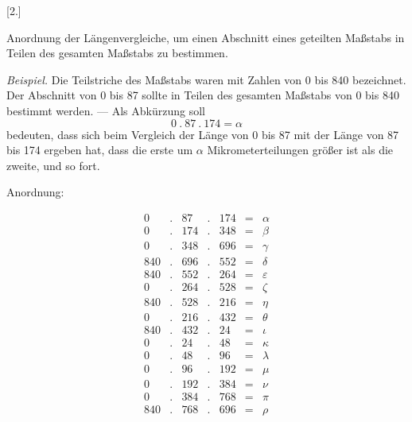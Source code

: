 \par{}
\begin{center}[2.]\end{center}
Anordnung der Längenvergleiche, um einen Abschnitt eines geteilten Maßstabs in Teilen des gesamten Maßstabs zu bestimmen.

\textit{Beispiel.} Die Teilstriche des Maßstabs waren mit Zahlen von 0 bis 840 bezeichnet. Der Abschnitt von 0 bis 87 sollte in Teilen des gesamten Maßstabs von 0 bis 840 bestimmt werden. — Als Abkürzung soll
\[
0\ .\ 87\ .\ 174=\alpha
\]
bedeuten, dass sich beim Vergleich der Länge von 0 bis 87 mit der Länge von 87 bis 174 ergeben hat, dass die erste um $\alpha$ Mikrometerteilungen größer ist als die zweite, und so fort.
\begin{center}Anordnung:\end{center}
\[
\begin{array}{rcrcrcl}
0&.&87&.&174&=&\alpha\\
0&.&174&.&348&=&\beta\\
0&.&348&.&696&=&\gamma\\
840&.&696&.&552&=&\delta\\
840&.&552&.&264&=&\varepsilon\\
0&.&264&.&528&=&\zeta\\
840&.&528&.&216&=&\eta\\
0&.&216&.&432&=&\theta\\
840&.&432&.&24&=&\iota\\
0&.&24&.&48&=&\kappa\\
0&.&48&.&96&=&\lambda\\
0&.&96&.&192&=&\mu\\
0&.&192&.&384&=&\nu\\
0&.&384&.&768&=&\pi\\
840&.&768&.&696&=&\rho
\end{array}
\]

